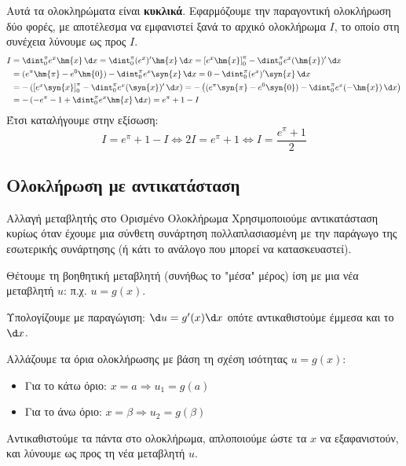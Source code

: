 \lysh
Αυτά τα ολοκληρώματα είναι \textbf{κυκλικά}. Εφαρμόζουμε την παραγοντική ολοκλήρωση δύο φορές, με αποτέλεσμα να εμφανιστεί ξανά το αρχικό ολοκλήρωμα $I$, το οποίο στη συνέχεια λύνουμε ως προς $I$.
\begin{align*}
I &= \dint_{0}^{\pi}{e^x \hm{x}\, \d x} = \dint_{0}^{\pi}{(e^x)' \hm{x}\, \d x} = \left[e^x \hm{x}\right]_0^{\pi} - \dint_{0}^{\pi}{e^x (\hm{x})'\, \d x} \\
&= (e^{\pi}\hm{\pi} - e^0\hm{0}) - \dint_{0}^{\pi}{e^x \syn{x}\, \d x} = 0 - \dint_{0}^{\pi}{(e^x)' \syn{x}\, \d x} \\
&= -\left( \left[e^x \syn{x}\right]_0^{\pi} - \dint_{0}^{\pi}{e^x (\syn{x})'\, \d x} \right) = -\left( (e^{\pi}\syn{\pi} - e^0\syn{0}) - \dint_{0}^{\pi}{e^x (-\hm{x})\, \d x} \right) \\
&= -\left( -e^{\pi} - 1 + \dint_{0}^{\pi}{e^x \hm{x}\, \d x} \right) = e^{\pi} + 1 - I
\end{align*}
Έτσι καταλήγουμε στην εξίσωση:
\[ I = e^{\pi} + 1 - I \iff 2I = e^{\pi} + 1 \iff I = \frac{e^{\pi} + 1}{2} \]

\subsection{Ολοκλήρωση με αντικατάσταση}
\begin{askhsh}{Αλλαγή μεταβλητής στο Ορισμένο Ολοκλήρωμα}
Χρησιμοποιούμε αντικατάσταση κυρίως όταν έχουμε μια σύνθετη συνάρτηση πολλαπλασιασμένη με την παράγωγο της εσωτερικής συνάρτησης (ή κάτι το ανάλογο που μπορεί να κατασκευαστεί).

\bhmata
\begin{bhma}
    \item Θέτουμε τη βοηθητική μεταβλητή (συνήθως το "μέσα" μέρος) ίση με μια νέα μεταβλητή $u$: π.χ. $u = g(x)$.
    \item Υπολογίζουμε με παραγώγιση: $\d u = g'(x)\d x$ οπότε αντικαθιστούμε έμμεσα και το $\d x$.
    \item Αλλάζουμε τα όρια ολοκλήρωσης με βάση τη σχέση ισότητας $u=g(x)$:
    \begin{itemize}
        \item Για το κάτω όριο: $x = a \Rightarrow u_1 = g(a)$
        \item Για το άνω όριο: $x = \beta \Rightarrow u_2 = g(\beta)$
    \end{itemize}
    \item Αντικαθιστούμε τα πάντα στο ολοκλήρωμα, απλοποιούμε ώστε τα $x$ να εξαφανιστούν, και λύνουμε ως προς τη νέα μεταβλητή $u$.
\end{bhma}
\end{askhsh}

